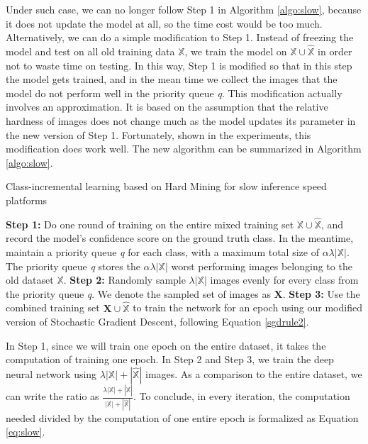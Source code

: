 Under such case, we can no longer follow Step 1 in Algorithm \ref{algo:slow}, because it does not update the model at all, so the time cost would be too much. Alternatively, we can do a simple modification to Step 1. Instead of freezing the model and test on all old training data $\mathbb{X}$, we train the model on $\mathbb{X}\cup \hat{\mathbb{X}}$ in order not to waste time on testing. In this way, Step 1 is modified so that in this step the model gets trained, and in the mean time we collect the images that the model do not perform well in the priority queue \textit{q}. This modification actually involves an approximation. It is based on the assumption that the relative hardness of images does not change much as the model updates its parameter in the new version of Step 1. Fortunately, shown in the experiments, this modification does work well. The new algorithm can be summarized in Algorithm \ref{algo:slow}.

\begin{algorithm}
	\caption{Class-incremental learning based on Hard Mining for slow inference speed platforms}
	\label{algo:slow}
	\begin{algorithmic}
		\State \textbf{Step 1:} Do one round of training on the entire mixed training set $\mathbb{X}\cup \hat{\mathbb{X}}$, and record the model's confidence score on the ground truth class. In the meantime, maintain a priority queue \textit{q} for each class, with a maximum total size of $\alpha \lambda |\mathbb{X}|$. The priority queue \textit{q} stores the $\alpha \lambda |\mathbb{X}|$ worst performing images belonging to the old dataset $\mathbb{X}$.
		\State \textbf{Step 2:} Randomly sample $\lambda|\mathbb{X}|$ images evenly for every class from the priority queue \textit{q}. We denote the sampled set of images as $\mathbf{X}$. 
		\State \textbf{Step 3:} Use the combined training set $\mathbf{X} \cup \hat{\mathbb{X}}$ to train the network for an epoch using our modified version of Stochastic Gradient Descent, following Equation \ref{sgdrule2}.
		\EndFor
	\end{algorithmic}
\end{algorithm}

In Step 1, since we will train one epoch on the entire dataset, it takes the computation of training one epoch. In Step 2 and Step 3, we train the deep neural network using $\lambda|\mathbb{X}| + |\hat{\mathbb{X}}|$ images. As a comparison to the entire dataset, we can write the ratio as
$\frac{\lambda|\mathbb{X}| + |\hat{\mathbb{X}}|}{|\mathbb{X}| + |\hat{\mathbb{X}}|}$. To conclude, in every iteration, the computation needed divided by the computation of one entire epoch is formalized as Equation \ref{eq:slow}.

